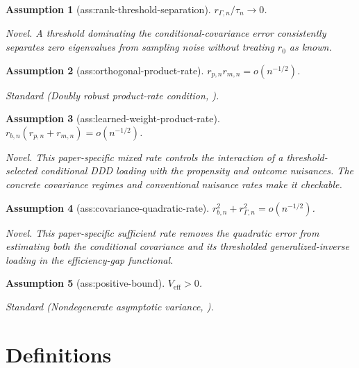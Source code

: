 \documentclass{article}
\newtheorem{assumption}{Assumption}
\begin{document}
\begin{assumption}[ass:rank-threshold-separation]\label{ass:rank-threshold-separation}
\(r_{\Gamma,n}/\tau_n\to0\).
\par\smallskip\noindent\emph{Novel.} A threshold dominating the conditional-covariance error consistently separates zero eigenvalues from sampling noise without treating \(r_0\) as known.
\end{assumption}

\begin{assumption}[ass:orthogonal-product-rate]\label{ass:orthogonal-product-rate}
\(r_{p,n}r_{m,n}=o(n^{-1/2})\).
\par\smallskip\noindent\emph{Standard} (Doubly robust product-rate condition, \cite{ChernozhukovEtAl2018DML}).
\end{assumption}

\begin{assumption}[ass:learned-weight-product-rate]\label{ass:learned-weight-product-rate}
\(r_{b,n}(r_{p,n}+r_{m,n})=o(n^{-1/2})\).
\par\smallskip\noindent\emph{Novel.} This paper-specific mixed rate controls the interaction of a threshold-selected conditional DDD loading with the propensity and outcome nuisances. The concrete covariance regimes and conventional nuisance rates make it checkable.
\end{assumption}

\begin{assumption}[ass:covariance-quadratic-rate]\label{ass:covariance-quadratic-rate}
\(r_{b,n}^2+r_{\Gamma,n}^2=o(n^{-1/2})\).
\par\smallskip\noindent\emph{Novel.} This paper-specific sufficient rate removes the quadratic error from estimating both the conditional covariance and its thresholded generalized-inverse loading in the efficiency-gap functional.
\end{assumption}

\begin{assumption}[ass:positive-bound]\label{ass:positive-bound}
\(V_{\mathrm{eff}}>0\).
\par\smallskip\noindent\emph{Standard} (Nondegenerate asymptotic variance, \cite{ChernozhukovEtAl2018DML}).
\end{assumption}

\section{Definitions}
\end{document}
